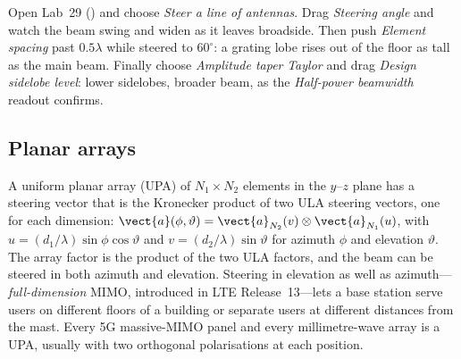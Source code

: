 \begin{tryit}
Open Lab~29 () and choose \emph{Steer a line of antennas}. Drag
\emph{Steering angle} and watch the beam swing and widen as it leaves broadside. Then push
\emph{Element spacing} past $0.5\lambda$ while steered to $60^\circ$: a grating lobe rises out of the
floor as tall as the main beam. Finally choose \emph{Amplitude taper} \emph{Taylor} and drag
\emph{Design sidelobe level}: lower sidelobes, broader beam, as the \emph{Half-power beamwidth}
readout confirms.
\end{tryit}

\subsection{Planar arrays}

A uniform planar array (UPA) of $N_1\times N_2$ elements in the $y$--$z$ plane has a steering vector
that is the Kronecker product of two ULA steering vectors, one for each dimension:
$\vect{a}(\phi,\vartheta)=\vect{a}_{N_2}(v)\otimes\vect{a}_{N_1}(u)$, with $u=(d_1/\lambda)\sin\phi\cos\vartheta$
and $v=(d_2/\lambda)\sin\vartheta$ for azimuth $\phi$ and elevation $\vartheta$. The array factor is the
product of the two ULA factors, and the beam can be steered in both azimuth and elevation. Steering
in elevation as well as azimuth---\emph{full-dimension} MIMO, introduced in LTE Release~13---lets a
base station serve users on different floors of a building or separate users at different distances
from the mast. Every 5G massive-MIMO panel and every millimetre-wave array is a UPA, usually with two
orthogonal polarisations at each position.



